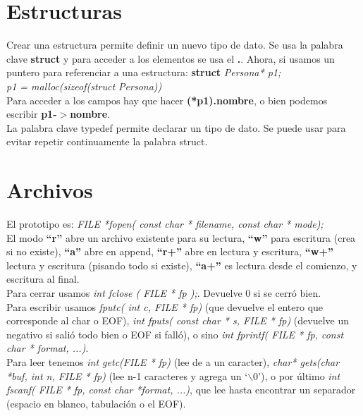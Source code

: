 \documentclass[11pt,a4paper]{article}
\begin{document}
\section{Estructuras}
Crear una estructura permite definir un nuevo tipo de dato. Se usa la palabra clave \textbf{struct} y para acceder a los elementos se usa el \textbf{.}. Ahora, si usamos un puntero para referenciar a una estructura:
\textbf{struct} \textit{Persona* p1;}\\
\textit{p1 = malloc(sizeof(struct Persona))}\\
Para acceder a los campos hay que hacer \textbf{(*p1).nombre}, o bien podemos escribir \textbf{p1-$>$nombre}.\\

La palabra clave typedef permite declarar un tipo de dato. Se puede usar para evitar repetir continuamente la palabra struct. 

\section{Archivos}
El prototipo es: \textit{FILE *fopen( const char * filename, const char * mode);}\\
El modo \textbf{``r''} abre un archivo existente para su lectura, \textbf{``w''} para escritura (crea si no existe), \textbf{``a''} abre en append, \textbf{``r+''} abre en lectura y escritura, \textbf{``w+''} lectura y escritura (pisando todo si existe), \textbf{``a+''} es lectura desde el comienzo, y escritura al final.\\ Para cerrar usamos \textit{int fclose ( FILE * fp );}. Devuelve 0 si se cerr\'o bien.\\ Para escribir usamos \textit{fputc( int c, FILE * fp)} (que devuelve el entero que corresponde al char o EOF), \textit{int fputs( const char * s, FILE * fp)} (devuelve un negativo si sali\'o todo bien o EOF si fall\'o), o sino \textit{int fprintf( FILE * fp, const char * format, ...)}.\\
Para leer tenemos \textit{int getc(FILE * fp)} (lee de a un caracter), \textit{char* gets(char *buf, int n, FILE * fp)} (lee n-1 caracteres y agrega un `$\backslash$0'), o por \'ultimo \textit{int fscanf( FILE * fp, const char *format, ...)}, que lee hasta encontrar un separador (espacio en blanco, tabulaci\'on o el EOF).
\end{document}
